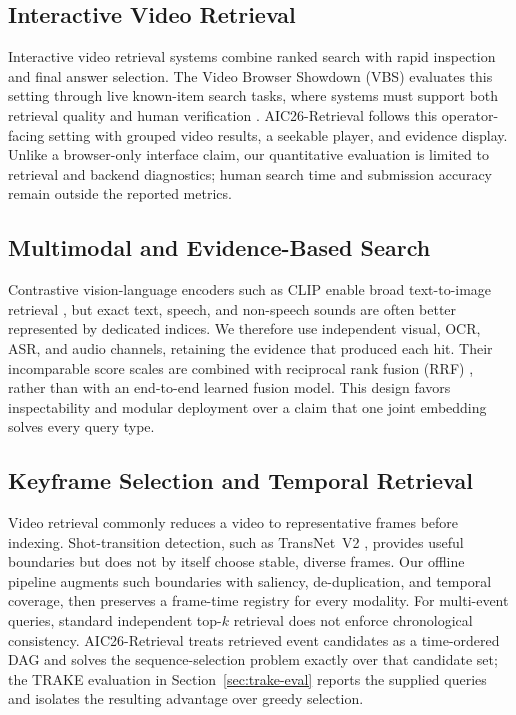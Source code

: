 \documentclass[conference]{IEEEtran}
\newcommand{\sys}{AIC26-Retrieval}
\begin{document}
\subsection{Interactive Video Retrieval}

Interactive video retrieval systems combine ranked search with rapid inspection
and final answer selection. The Video Browser Showdown (VBS) evaluates this
setting through live known-item search tasks, where systems must support both
retrieval quality and human verification \cite{rossetto2025vbs2024,rossetto2025vbs2025}.
\sys{} follows this operator-facing setting with grouped video results, a
seekable player, and evidence display. Unlike a browser-only interface claim,
our quantitative evaluation is limited to retrieval and backend diagnostics;
human search time and submission accuracy remain outside the reported metrics.

\subsection{Multimodal and Evidence-Based Search}

Contrastive vision-language encoders such as CLIP enable broad text-to-image
retrieval \cite{radford2021clip}, but exact text, speech, and non-speech sounds
are often better represented by dedicated indices. We therefore use independent
visual, OCR, ASR, and audio channels, retaining the evidence that produced each
hit. Their incomparable score scales are combined with reciprocal rank fusion
(RRF) \cite{cormack2009rrf}, rather than with an end-to-end learned fusion model.
This design favors inspectability and modular deployment over a claim that one
joint embedding solves every query type.

\subsection{Keyframe Selection and Temporal Retrieval}

Video retrieval commonly reduces a video to representative frames before
indexing. Shot-transition detection, such as TransNet~V2 \cite{soucek2020transnetv2},
provides useful boundaries but does not by itself choose stable, diverse frames.
Our offline pipeline augments such boundaries with saliency, de-duplication, and
temporal coverage, then preserves a frame-time registry for every modality.
For multi-event queries, standard independent top-$k$ retrieval does not enforce
chronological consistency. \sys{} treats retrieved event candidates as a
time-ordered DAG and solves the sequence-selection problem exactly over that
candidate set; the TRAKE evaluation in Section~\ref{sec:trake-eval} reports the
supplied queries and isolates the resulting advantage over greedy selection.
\end{document}
